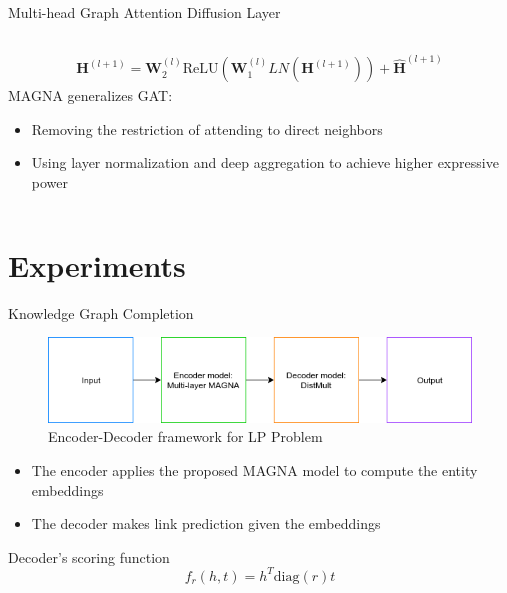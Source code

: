 \documentclass[notheorems, aspectratio=149]{beamer}
\begin{document}
\begin{frame}{Multi-head Graph Attention Diffusion Layer}
\begin{columns}
\begin{column}{0.6\textwidth}
\begin{gather*}
						\mathbf{H}^{(l+1)} = \mathbf{W}_2^{(l)}\text{ReLU}(\mathbf{W}_1^{(l)}LN(\mathbf{H}^{(l+1)})) + \hat{\mathbf{H}}^{(l+1)}
					\end{gather*}
					MAGNA generalizes GAT:
					\begin{itemize}
						\item Removing the restriction of attending to direct neighbors
						\item Using layer normalization and deep aggregation to achieve
						higher expressive power
					\end{itemize}
				\end{column}
			\end{columns}
		\end{frame}
		\section{Experiments}
		\begin{frame}{Knowledge Graph Completion}
			\begin{figure}[H]
				\centering
				\includegraphics[width=1\linewidth]{figs/kgc.png}
				\caption{Encoder-Decoder framework for LP Problem}
				\label{fig:writing-thesis}
			\end{figure}
			\begin{itemize}
				\item The encoder applies the proposed MAGNA model to compute the entity embeddings
				\item The decoder makes link prediction given the embeddings
			\end{itemize}
			Decoder's scoring function
			\begin{equation}
				f_r(h, t) = h^T\text{diag}(r)t
			\end{equation}
		\end{frame}
\end{document}
